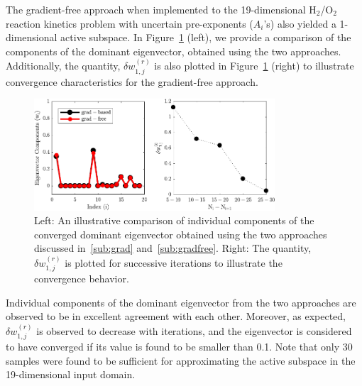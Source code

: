 The gradient-free approach when implemented to the 19-dimensional H$_2$/O$_2$ reaction kinetics problem
with uncertain pre-exponents ($A_i$'s) also yielded a 1-dimensional active subspace. In Figure~\ref{fig:comp} (left),
we provide a comparison of the components of the dominant eigenvector, obtained using the two approaches.
Additionally, the quantity, $\delta w_{1,j}^{(r)}$ is also plotted in
Figure~\ref{fig:comp} (right) to illustrate convergence characteristics for the gradient-free approach.
%
\begin{figure}[htbp]
 \begin{center}
  \includegraphics[width=0.8\textwidth]{./Figures/eigv6}
\caption{Left: An illustrative comparison of individual components of the converged dominant eigenvector obtained
using the two approaches discussed in~\ref{sub:grad} and~\ref{sub:gradfree}. Right: The quantity,  $\delta w_{1,j}^{(r)}$
is plotted for successive iterations to illustrate the convergence behavior.}
\label{fig:comp}
\end{center}
\end{figure}
%
Individual components of the dominant eigenvector from the two approaches are observed to be in excellent
agreement with each other. Moreover, as expected,  $\delta w_{1,j}^{(r)}$ is observed to decrease with iterations, and
the eigenvector is considered to have converged if its value is found to be smaller than 0.1. Note that only 30 samples
were found to be sufficient for approximating the active subspace in the 19-dimensional input domain. 

